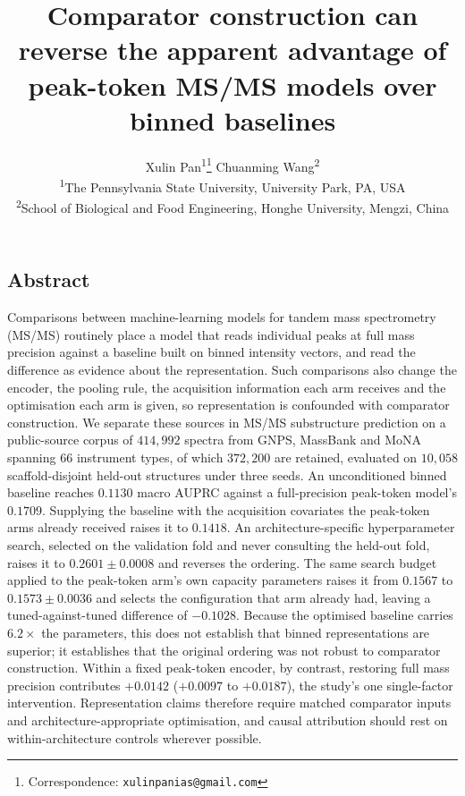 \documentclass[11pt]{article}
\title{\vspace{-2em}\bfseries Comparator construction can reverse the apparent
advantage of peak-token MS/MS models over binned baselines}
\author{Xulin Pan\textsuperscript{1}\thanks{Correspondence: \texttt{xulinpanias@gmail.com}}
\quad Chuanming Wang\textsuperscript{2}\\[4pt]
\small \textsuperscript{1}The Pennsylvania State University, University Park, PA, USA\\
\small \textsuperscript{2}School of Biological and Food Engineering, Honghe University, Mengzi, China}
\date{}
\begin{document}
\maketitle

\subsection*{Abstract}
\small
Comparisons between machine-learning models for tandem mass spectrometry (MS/MS)
routinely place a model that reads individual peaks at full mass precision against a
baseline built on binned intensity vectors, and read the difference as evidence about
the representation. Such comparisons also change the encoder, the pooling rule, the
acquisition information each arm receives and the optimisation each arm is given, so
representation is confounded with comparator construction. We separate these sources
in MS/MS substructure prediction on a public-source corpus of $414{,}992$ spectra
from GNPS, MassBank and MoNA spanning $66$ instrument types, of which $372{,}200$ are
retained, evaluated on $10{,}058$ scaffold-disjoint held-out structures under three
seeds. An unconditioned binned baseline reaches $0.1130$ macro AUPRC against a
full-precision peak-token model's $0.1709$. Supplying the baseline with the
acquisition covariates the peak-token arms already received raises it to $0.1418$. An
architecture-specific hyperparameter search, selected on the validation fold and never
consulting the held-out fold, raises it to $0.2601 \pm 0.0008$ and reverses the
ordering. The same search budget applied to the peak-token arm's own capacity
parameters raises it from $0.1567$ to $0.1573 \pm 0.0036$ and selects the
configuration that arm already had, leaving a tuned-against-tuned difference of
$-0.1028$. Because the optimised baseline carries $6.2\times$ the parameters, this
does not establish that binned representations are superior; it establishes that the
original ordering was not robust to comparator construction. Within a fixed
peak-token encoder, by contrast, restoring full mass precision contributes $+0.0142$
($+0.0097$ to $+0.0187$), the study's one single-factor intervention. Representation
claims therefore require matched comparator inputs and architecture-appropriate
optimisation, and causal attribution should rest on within-architecture controls
wherever possible.
\normalsize
\end{document}
